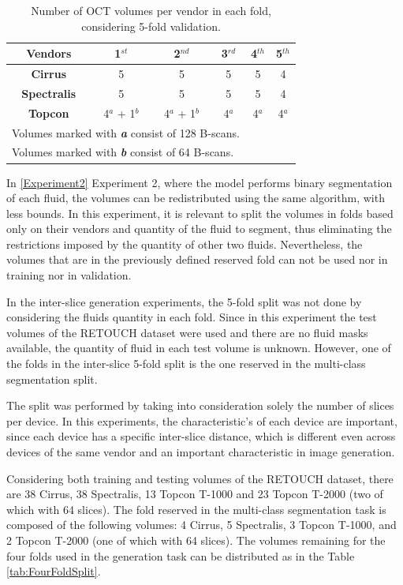 \begin{table}[!ht]
	\setlength{\tabcolsep}{6pt}
	\renewcommand{\arraystretch}{1.3}
	\caption{Number of OCT volumes per vendor in each fold, considering 5-fold validation.}
	\centering
	\begin{tabular}{|c|c|c|c|c|c|}
		\hline
		\textbf{Vendors} & \textbf{1$^{st}$} & \textbf{2$^{nd}$} & \textbf{3$^{rd}$} & \textbf{4$^{th}$} & \textbf{5$^{th}$} \\
		\hline
		\textbf{Cirrus} & 5 & 5 & 5 & 5 & 4 \\
		\textbf{Spectralis} & 5 & 5 & 5 & 5 & 4 \\
		\textbf{Topcon} & 4$^{a}$ + 1$^{b}$ & 4$^{a}$ + 1$^{b}$ & 4$^{a}$ & 4$^{a}$ & 4$^{a}$ \\
		\hline
		\multicolumn{4}{l}{Volumes marked with \textbf{\textit{a}} consist of 128 B-scans.} \\
		\multicolumn{4}{l}{Volumes marked with \textbf{\textit{b}} consist of 64 B-scans.}
	\end{tabular}
	\label{tab:FiveFoldSplit}
\end{table}

In \ref{Experiment2} Experiment 2, where the model performs binary segmentation of each fluid, the volumes can be redistributed using the same algorithm, with less bounds. In this experiment, it is relevant to split the volumes in folds based only on their vendors and quantity of the fluid to segment, thus eliminating the restrictions imposed by the quantity of other two fluids. Nevertheless, the volumes that are in the previously defined reserved fold can not be used nor in training nor in validation.
\par
In the inter-slice generation experiments, the 5-fold split was not done by considering the fluids quantity in each fold. Since in this experiment the test volumes of the RETOUCH dataset were used and there are no fluid masks available, the quantity of fluid in each test volume is unknown. However, one of the folds in the inter-slice 5-fold split is the one reserved in the multi-class segmentation split.
\par
The split was performed by taking into consideration solely the number of slices per device. In this experiments, the characteristic's of each device are important, since each device has a specific inter-slice distance, which is different even across devices of the same vendor and an important characteristic in image generation.
\par
Considering both training and testing volumes of the RETOUCH dataset, there are 38 Cirrus, 38 Spectralis, 13 Topcon T-1000 and 23 Topcon T-2000 (two of which with 64 slices). The fold reserved in the multi-class segmentation task is composed of the following volumes: 4 Cirrus, 5 Spectralis, 3 Topcon T-1000, and 2 Topcon T-2000 (one of which with 64 slices). The volumes remaining for the four folds used in the generation task can be distributed as in the Table \ref{tab:FourFoldSplit}.

